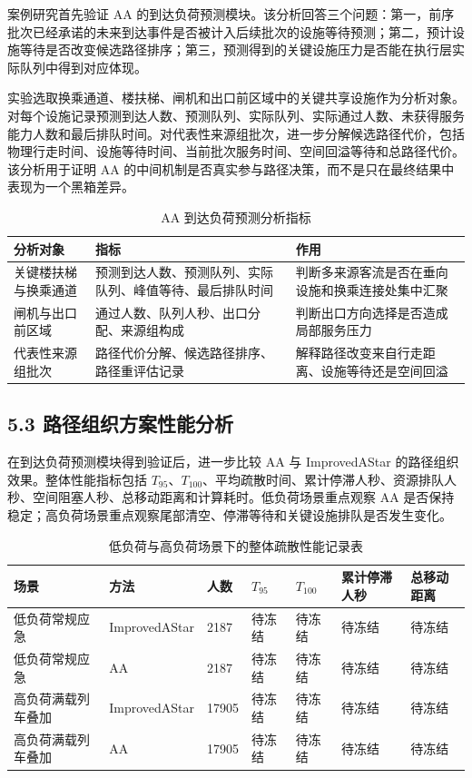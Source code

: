 \documentclass[UTF8,a4paper,12pt]{ctexart}
\begin{document}
案例研究首先验证 AA 的到达负荷预测模块。该分析回答三个问题：第一，前序批次已经承诺的未来到达事件是否被计入后续批次的设施等待预测；第二，预计设施等待是否改变候选路径排序；第三，预测得到的关键设施压力是否能在执行层实际队列中得到对应体现。

实验选取换乘通道、楼扶梯、闸机和出口前区域中的关键共享设施作为分析对象。对每个设施记录预测到达人数、预测队列、实际队列、实际通过人数、未获得服务能力人数和最后排队时间。对代表性来源组批次，进一步分解候选路径代价，包括物理行走时间、设施等待时间、当前批次服务时间、空间回溢等待和总路径代价。该分析用于证明 AA 的中间机制是否真实参与路径决策，而不是只在最终结果中表现为一个黑箱差异。

\begin{table}[htbp]
\centering
\caption{AA 到达负荷预测分析指标}
\small
\begin{tabular}{p{}p{}p{}}
\toprule
分析对象 & 指标 & 作用 \\
\midrule
关键楼扶梯与换乘通道 & 预测到达人数、预测队列、实际队列、峰值等待、最后排队时间 & 判断多来源客流是否在垂向设施和换乘连接处集中汇聚 \\
闸机与出口前区域 & 通过人数、队列人秒、出口分配、来源组构成 & 判断出口方向选择是否造成局部服务压力 \\
代表性来源组批次 & 路径代价分解、候选路径排序、路径重评估记录 & 解释路径改变来自行走距离、设施等待还是空间回溢 \\
\bottomrule
\end{tabular}
\end{table}

\subsection{5.3 路径组织方案性能分析}

在到达负荷预测模块得到验证后，进一步比较 AA 与 ImprovedAStar 的路径组织效果。整体性能指标包括 \(T_{95}\)、\(T_{100}\)、平均疏散时间、累计停滞人秒、资源排队人秒、空间阻塞人秒、总移动距离和计算耗时。低负荷场景重点观察 AA 是否保持稳定；高负荷场景重点观察尾部清空、停滞等待和关键设施排队是否发生变化。

\begin{table}[htbp]
\centering
\caption{低负荷与高负荷场景下的整体疏散性能记录表}
\small
\begin{tabular}{p{}p{}p{}p{}p{}p{}p{}}
\toprule
场景 & 方法 & 人数 & \(T_{95}\) & \(T_{100}\) & 累计停滞人秒 & 总移动距离 \\
\midrule
低负荷常规应急 & ImprovedAStar & 2187 & 待冻结 & 待冻结 & 待冻结 & 待冻结 \\
低负荷常规应急 & AA & 2187 & 待冻结 & 待冻结 & 待冻结 & 待冻结 \\
高负荷满载列车叠加 & ImprovedAStar & 17905 & 待冻结 & 待冻结 & 待冻结 & 待冻结 \\
高负荷满载列车叠加 & AA & 17905 & 待冻结 & 待冻结 & 待冻结 & 待冻结 \\
\bottomrule
\end{tabular}
\end{table}
\end{document}
